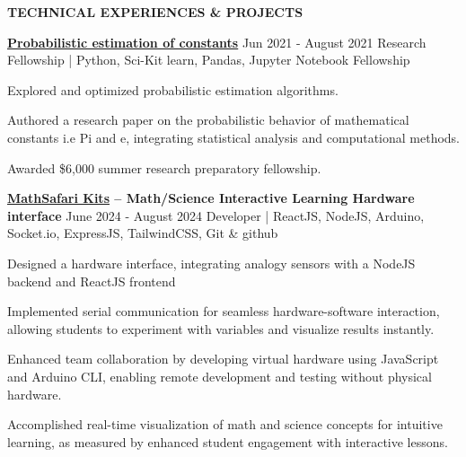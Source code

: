 \begin{rSection}
{\small \normalfont \textbf{ TECHNICAL EXPERIENCES \& PROJECTS}}
       

\begin{rSubsection}{\bf \href{https://www.ignasxv.com/Math} {Probabilistic estimation of constants}}
    {\ttfamily Jun 2021 - August 2021}
    {Research Fellowship {\normalfont \small \ttfamily | Python, Sci-Kit learn, Pandas, Jupyter Notebook}}
    {Fellowship}
        \item Explored and optimized probabilistic estimation algorithms.
        \item Authored a research paper on the probabilistic behavior of mathematical constants i.e Pi and e, integrating statistical analysis and computational methods.
        \item Awarded \$6,000 summer research preparatory fellowship.
\end{rSubsection}

    \begin{rSubsection}{\bf \href{https://github.com/ignasxv/master-of-education}{MathSafari Kits} – Math/Science Interactive Learning Hardware interface}
        {\ttfamily June 2024 - August 2024} 
        {Developer {\normalfont \small \ttfamily | ReactJS, NodeJS, Arduino, Socket.io, ExpressJS, TailwindCSS, Git \& github}} 
        {}
        \item Designed a hardware interface, integrating analogy sensors with a NodeJS backend and ReactJS frontend 
        \item Implemented serial communication for seamless hardware-software interaction, allowing students to experiment with variables and visualize results instantly.
        \item Enhanced team collaboration by developing virtual hardware using JavaScript and Arduino CLI, enabling remote development and testing without physical hardware.
        \item Accomplished real-time visualization of math and science concepts for intuitive learning, as measured by enhanced student engagement with interactive lessons.
    \end{rSubsection}


\end{rSection}
